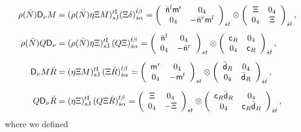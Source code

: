 \documentclass[11pt]{article}
\newcommand{\sI}{\mathrm  I}
\newcommand{\sJ}{\mathrm J}
\begin{document}
\begin{align}
\rho(\bar N ){\sf D_{\nu}}M & =(\rho(\bar N)\eta\Xi M)_{s\sJ}^{t\sI}(\Xi\delta)_{\dot{s}\alpha}^{\dot{t}\beta}=
\left(
  \begin{array}{cc}
    \bar{\sf n}^l\sf{m}^r & 0_{4}\\
    0_{4} & -\bar{\sf n}^r {\sf m}^l
  \end{array}
\right)_{st}\otimes
\left(
  \begin{array}{cc}
    \Xi & 0_{4}\\
    0_{4} &\Xi
  \end{array}
\right)_{\dot s\dot t},\label{eq:102}\\[5pt]
\rho(\bar{N})Q\sf D_{\nu} & =(\rho(\bar N)\eta\Xi)_{s\sJ}^{t\sI}\,(Q\Xi)_{\dot s\alpha}^{\dot t\beta}=
\left(
  \begin{array}{cc}
    \bar{\sf n}^l & 0_{4}\\
      0_{4} & -\bar{\sf n}^r
    \end{array}\right)_{st}\otimes
  \left(
    \begin{array}{cc}
      {\sf c}_{R} & 0_{4}\\
      0_{4} & {\sf c}_{R}
    \end{array}\right)_{\dot s\dot t},\\[5pt]
{\sf D_{\nu}}M\bar{R} & =(\eta\Xi M)_{s\sJ}^{t\sI}\,(\Xi\bar{R})_{\dot{s}\alpha}^{\dot{t}\beta}=
\left(
  \begin{array}{cc}
    {\sf m}^{r} & 0_{4}\\
    0_{4} & -{\sf m}^l
  \end{array}\right)_{st}\otimes
\left(
  \begin{array}{cc}
    \bar{\sf d}_{R} & 0_{4}\\
    0_{4} & \bar{\sf d}_{R}
  \end{array}
\right)_{\dot{s}\dot{t}},\\[5pt]
Q{\sf D}_{\nu}\bar{R} &
=(\eta\Xi)_{s\sJ}^{t\sI}\,(Q\Xi\bar{R})_{\dot{s}\alpha}^{\dot{t}\beta}=
\left(
  \begin{array}{cc}
    \Xi & 0_{4}\\
    0_{4} & -\Xi
  \end{array}\right)_{st}\otimes
\left(
  \begin{array}{cc}
    {\sf c}_{R}{\bar{\sf d}_{R}} & 0_{4}\\
    0_{4} & {\sf c}_{R}\bar{\sf d}_{R}
  \end{array}
\right)_{\dot{s}\dot{t}},
\end{align}
where we defined 
\end{document}
